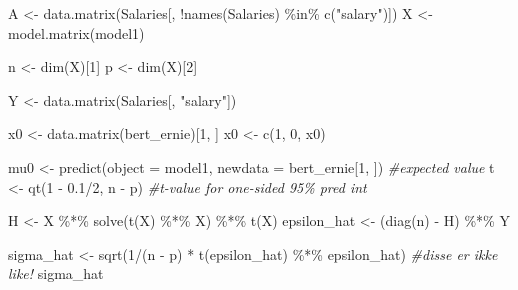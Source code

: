 \documentclass[
]{article}
\newenvironment{Shaded}{\begin{snugshade}}{\end{snugshade}}
\newcommand{\AttributeTok}[1]{\textcolor[rgb]{0.77,0.63,0.00}{#1}}
\newcommand{\CommentTok}[1]{\textcolor[rgb]{0.56,0.35,0.01}{\textit{#1}}}
\newcommand{\DecValTok}[1]{\textcolor[rgb]{0.00,0.00,0.81}{#1}}
\newcommand{\FloatTok}[1]{\textcolor[rgb]{0.00,0.00,0.81}{#1}}
\newcommand{\FunctionTok}[1]{\textcolor[rgb]{0.00,0.00,0.00}{#1}}
\newcommand{\NormalTok}[1]{#1}
\newcommand{\OtherTok}[1]{\textcolor[rgb]{0.56,0.35,0.01}{#1}}
\newcommand{\SpecialCharTok}[1]{\textcolor[rgb]{0.00,0.00,0.00}{#1}}
\newcommand{\StringTok}[1]{\textcolor[rgb]{0.31,0.60,0.02}{#1}}
\begin{document}
\begin{Shaded}
\begin{Highlighting}[]
\NormalTok{A }\OtherTok{\textless{}{-}} \FunctionTok{data.matrix}\NormalTok{(Salaries[, }\SpecialCharTok{!}\FunctionTok{names}\NormalTok{(Salaries) }\SpecialCharTok{\%in\%} \FunctionTok{c}\NormalTok{(}\StringTok{"salary"}\NormalTok{)])}
\NormalTok{X }\OtherTok{\textless{}{-}} \FunctionTok{model.matrix}\NormalTok{(model1)}

\NormalTok{n }\OtherTok{\textless{}{-}} \FunctionTok{dim}\NormalTok{(X)[}\DecValTok{1}\NormalTok{]}
\NormalTok{p }\OtherTok{\textless{}{-}} \FunctionTok{dim}\NormalTok{(X)[}\DecValTok{2}\NormalTok{]}


\NormalTok{Y }\OtherTok{\textless{}{-}} \FunctionTok{data.matrix}\NormalTok{(Salaries[, }\StringTok{"salary"}\NormalTok{])}

\NormalTok{x0 }\OtherTok{\textless{}{-}} \FunctionTok{data.matrix}\NormalTok{(bert\_ernie)[}\DecValTok{1}\NormalTok{, ]}
\NormalTok{x0 }\OtherTok{\textless{}{-}} \FunctionTok{c}\NormalTok{(}\DecValTok{1}\NormalTok{, }\DecValTok{0}\NormalTok{, x0)}

\NormalTok{mu0 }\OtherTok{\textless{}{-}} \FunctionTok{predict}\NormalTok{(}\AttributeTok{object =}\NormalTok{ model1, }\AttributeTok{newdata =}\NormalTok{ bert\_ernie[}\DecValTok{1}\NormalTok{, ])  }\CommentTok{\#expected value}
\NormalTok{t }\OtherTok{\textless{}{-}} \FunctionTok{qt}\NormalTok{(}\DecValTok{1} \SpecialCharTok{{-}} \FloatTok{0.1}\SpecialCharTok{/}\DecValTok{2}\NormalTok{, n }\SpecialCharTok{{-}}\NormalTok{ p)  }\CommentTok{\#t{-}value for one{-}sided 95\% pred int}

\NormalTok{H }\OtherTok{\textless{}{-}}\NormalTok{ X }\SpecialCharTok{\%*\%} \FunctionTok{solve}\NormalTok{(}\FunctionTok{t}\NormalTok{(X) }\SpecialCharTok{\%*\%}\NormalTok{ X) }\SpecialCharTok{\%*\%} \FunctionTok{t}\NormalTok{(X)}
\NormalTok{epsilon\_hat }\OtherTok{\textless{}{-}}\NormalTok{ (}\FunctionTok{diag}\NormalTok{(n) }\SpecialCharTok{{-}}\NormalTok{ H) }\SpecialCharTok{\%*\%}\NormalTok{ Y}

\NormalTok{sigma\_hat }\OtherTok{\textless{}{-}} \FunctionTok{sqrt}\NormalTok{(}\DecValTok{1}\SpecialCharTok{/}\NormalTok{(n }\SpecialCharTok{{-}}\NormalTok{ p) }\SpecialCharTok{*} \FunctionTok{t}\NormalTok{(epsilon\_hat) }\SpecialCharTok{\%*\%}\NormalTok{ epsilon\_hat)  }\CommentTok{\#disse er ikke like!}
\NormalTok{sigma\_hat}
\end{Highlighting}
\end{Shaded}
\end{document}

